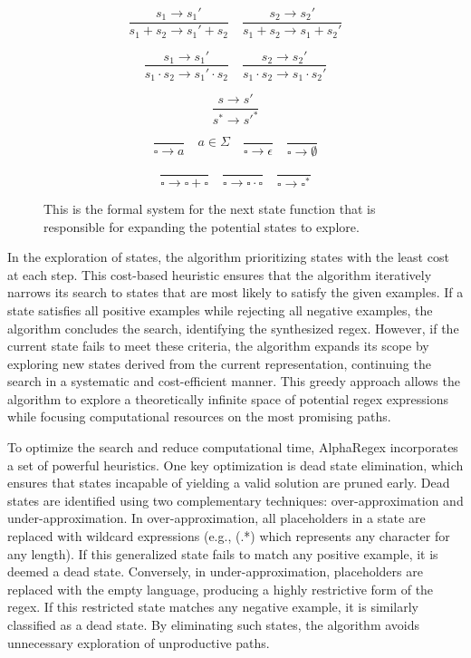 \begin{figure}[ht]
    \centering
    \captionsetup{justification=centering}
    \[
    \frac{s_1 \to s_1'}{s_1 + s_2 \to s_1' + s_2}
    \quad
    \frac{s_2 \to s_2'}{s_1 + s_2 \to s_1 + s_2'}
    \]

    \[
    \frac{s_1 \to s_1'}{s_1 \cdot s_2 \to s_1' \cdot s_2}
    \quad
    \frac{s_2 \to s_2'}{s_1 \cdot s_2 \to s_1 \cdot s_2'}
    \]

    \[
    \frac{s \to s'}{s^* \to s'^*}
    \]

    \[
    \frac{}{\square \to a} \quad a \in \Sigma
    \quad
    \frac{}{\square \to \epsilon}
    \quad
    \frac{}{\square \to \emptyset}
    \]

    \[
    \frac{}{\square \to \square + \square}
    \quad
    \frac{}{\square \to \square \cdot \square}
    \quad
    \frac{}{\square \to \square^*}
    \]
    
    \caption{This is the formal system for the next state function that is responsible for expanding the potential states to explore.}
    \label{fig:transition_rules}
\end{figure}

\indent\indent In the exploration of states, the algorithm prioritizing states with the least cost at each step. This cost-based heuristic ensures that the algorithm iteratively narrows its search to states that are most likely to satisfy the given examples. If a state satisfies all positive examples while rejecting all negative examples, the algorithm concludes the search, identifying the synthesized regex. However, if the current state fails to meet these criteria, the algorithm expands its scope by exploring new states derived from the current representation, continuing the search in a systematic and cost-efficient manner. This greedy approach allows the algorithm to explore a theoretically infinite space of potential regex expressions while focusing computational resources on the most promising paths.

\indent \indent To optimize the search and reduce computational time, AlphaRegex incorporates a set of powerful heuristics. One key optimization is dead state elimination, which ensures that states incapable of yielding a valid solution are pruned early. Dead states are identified using two complementary techniques: over-approximation and under-approximation. In over-approximation, all placeholders in a state are replaced with wildcard expressions (e.g., (.*) which represents any character for any length). If this generalized state fails to match any positive example, it is deemed a dead state. Conversely, in under-approximation, placeholders are replaced with the empty language, producing a highly restrictive form of the regex. If this restricted state matches any negative example, it is similarly classified as a dead state. By eliminating such states, the algorithm avoids unnecessary exploration of unproductive paths.

